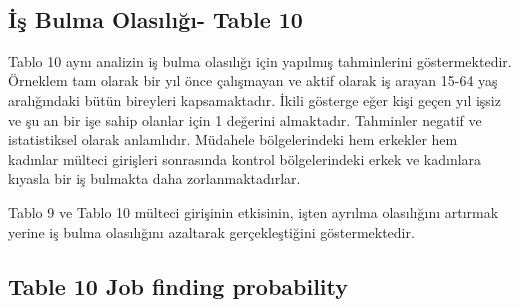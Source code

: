 \documentclass{article}
\begin{document}
\
\
{
\def\sym#1{\ifmmode^{#1}\else\(^{#1}\)\fi}


\newpage
    \subsection*{İş Bulma Olasılığı- Table 10}
    Tablo 10 aynı analizin iş bulma olasılığı için yapılmış tahminlerini göstermektedir. Örneklem tam olarak bir yıl önce çalışmayan ve aktif olarak iş arayan 15-64 yaş aralığındaki bütün bireyleri kapsamaktadır. İkili gösterge eğer kişi geçen yıl işsiz ve şu an bir işe sahip olanlar için 1 değerini almaktadır. Tahminler negatif ve istatistiksel olarak anlamlıdır. Müdahele bölgelerindeki hem erkekler hem kadınlar mülteci girişleri sonrasında kontrol bölgelerindeki erkek ve kadınlara kıyasla bir iş bulmakta daha zorlanmaktadırlar. 

Tablo 9 ve Tablo 10 mülteci girişinin etkisinin, işten ayrılma olasılığını artırmak yerine iş bulma olasılığını azaltarak gerçekleştiğini göstermektedir.

\subsection*{Table 10 Job finding probability}


}
\end{document}
